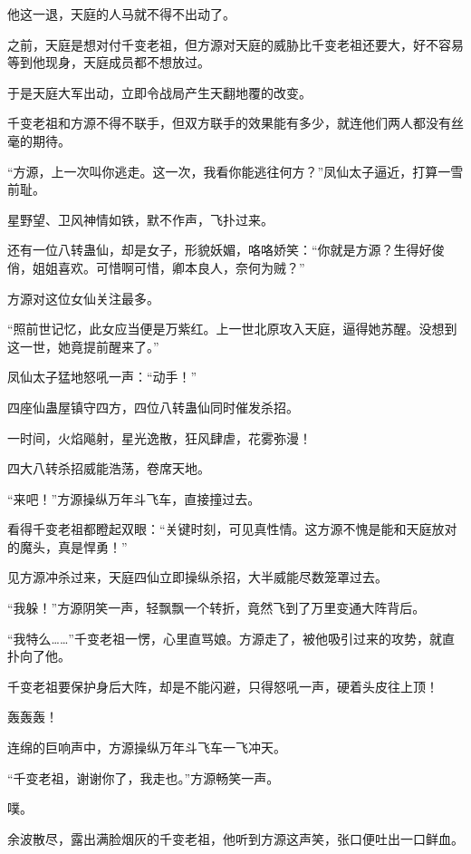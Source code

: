 \begin{this_body}
他这一退，天庭的人马就不得不出动了。

之前，天庭是想对付千变老祖，但方源对天庭的威胁比千变老祖还要大，好不容易等到他现身，天庭成员都不想放过。

于是天庭大军出动，立即令战局产生天翻地覆的改变。

千变老祖和方源不得不联手，但双方联手的效果能有多少，就连他们两人都没有丝毫的期待。

“方源，上一次叫你逃走。这一次，我看你能逃往何方？”凤仙太子逼近，打算一雪前耻。

星野望、卫风神情如铁，默不作声，飞扑过来。

还有一位八转蛊仙，却是女子，形貌妖媚，咯咯娇笑：“你就是方源？生得好俊俏，姐姐喜欢。可惜啊可惜，卿本良人，奈何为贼？”

方源对这位女仙关注最多。

“照前世记忆，此女应当便是万紫红。上一世北原攻入天庭，逼得她苏醒。没想到这一世，她竟提前醒来了。”

凤仙太子猛地怒吼一声：“动手！”

四座仙蛊屋镇守四方，四位八转蛊仙同时催发杀招。

一时间，火焰飚射，星光逸散，狂风肆虐，花雾弥漫！

四大八转杀招威能浩荡，卷席天地。

“来吧！”方源操纵万年斗飞车，直接撞过去。

看得千变老祖都瞪起双眼：“关键时刻，可见真性情。这方源不愧是能和天庭放对的魔头，真是悍勇！”

见方源冲杀过来，天庭四仙立即操纵杀招，大半威能尽数笼罩过去。

“我躲！”方源阴笑一声，轻飘飘一个转折，竟然飞到了万里变通大阵背后。

“我特么……”千变老祖一愣，心里直骂娘。方源走了，被他吸引过来的攻势，就直扑向了他。

千变老祖要保护身后大阵，却是不能闪避，只得怒吼一声，硬着头皮往上顶！

轰轰轰！

连绵的巨响声中，方源操纵万年斗飞车一飞冲天。

“千变老祖，谢谢你了，我走也。”方源畅笑一声。

噗。

余波散尽，露出满脸烟灰的千变老祖，他听到方源这声笑，张口便吐出一口鲜血。

\end{this_body}

